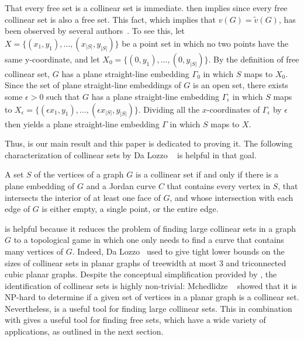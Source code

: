 That every free set is a collinear set is immediate.  then implies  since every free collinear set is also a free set. 
This fact, which implies that $v(G)=\tilde{v}(G)$, has been observed by several
authors~\cite{bose.dujmovic.ea:polynomial,dalozzo.dujmovic.ea:drawing,dujmovic:utility,gkossw-upg-09}. To
see this,
let $X=\{(x_1,y_1),\ldots,(x_{|S|},y_{|S|})\}$ be a point set in which
no two points have the same y-coordinate, and let
$X_0=\{(0,y_1),\ldots,(0,y_{|S|})\}$.  By the definition of free
collinear set, $G$ has a plane straight-line embedding $\Gamma_0$ in
which $S$ maps to $X_0$.  Since the set of plane straight-line embeddings of
$G$ is an open set, there exists some $\epsilon >0$ such that $G$ has a
plane straight-line embedding $\Gamma_{\epsilon}$ in which $S$ maps to
$X_\epsilon=\{(\epsilon x_1,y_1),\ldots,(\epsilon x_{|S|},y_{|S|})\}$.
Dividing all the $x$-coordinates of $\Gamma_\epsilon$ by $\epsilon$ then
yields a plane straight-line embedding $\Gamma$ in which $S$ maps to
$X$. 

Thus,  is our main result and this paper is dedicated to
proving it. The following
characterization of collinear sets by Da Lozzo \etal\
\cite{dalozzo.dujmovic.ea:drawing}  is helpful in that goal.

\begin{thm}\cite{dalozzo.dujmovic.ea:drawing} 
	A set $S$ of the vertices of a graph $G$ is a collinear set if and
	only if there is a plane embedding of $G$ and a Jordan curve $C$
	that contains every vertex in $S$, that intersects the interior of
	at least one face of $G$, and whose intersection with
	each edge of $G$ is either empty, a single point, or the entire edge.
\end{thm}

  is helpful because it reduces the problem of
finding large collinear sets in a graph $G$ to a topological game in
which one only needs to find a curve that contains many vertices
of $G$.  Indeed, Da Lozzo \etal\ used \thmref{collinear-set} to give
tight lower bounds on the sizes of collinear sets in planar graphs
of treewidth at most 3 and triconnected cubic planar graphs. Despite the conceptual simplification provided by ,
the identification of collinear sets is highly non-trivial:  Mchedlidze
\etal\ \cite{mchedlidze.radermacher.ea:aligned} showed that it is NP-hard to
determine if a given set of vertices in a planar graph is a collinear
set.
%
Nevertheless,  is a useful tool for finding large 
collinear sets. This in combination with \corref{our-all} gives a useful
tool for finding free sets, which have a wide variety of applications,
as outlined in the next section.


